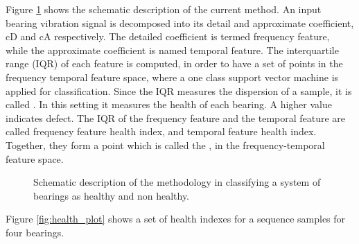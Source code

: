 \documentclass[../Main/thesis.tex]{subfiles}
\begin{document}
Figure \ref{fig:method2} shows the schematic description of the current method. An input bearing vibration signal is decomposed into its detail and approximate coefficient, cD and cA respectively. The detailed coefficient is termed frequency feature, while the approximate coefficient is named temporal feature. The interquartile range (IQR) of each feature is computed, in order to have a set of points in the frequency temporal feature space, where a one class support vector machine is applied for classification. Since the IQR measures the dispersion of a sample, it is called . In this setting it measures the health of each bearing. A higher value indicates defect. The IQR of the frequency feature and the temporal feature are called frequency feature health index, and temporal feature health index. Together, they form a point which is called the , in the frequency-temporal feature space.


\begin{figure}[H]
	\caption{Schematic description of the methodology in classifying a system of bearings as healthy and non healthy.}
	\label{fig:method2}
\end{figure}
\justify
Figure \ref{fig:health_plot} shows a set of health indexes for a sequence samples for four bearings. 
\end{document}
